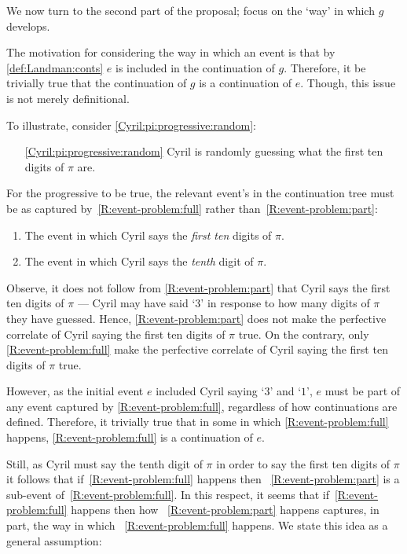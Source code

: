 \begin{note}[Way]
  We now turn to the second part of the proposal; focus on the `way' in which \(g\) develops.

  The motivation for considering the way in which an event is that by \autoref{def:Landman:conts} \(e\) is included in the continuation of \(g\).
  Therefore, it be trivially true that the continuation of \(g\) is a continuation of \(e\).
  Though, this issue is not merely definitional.

  To illustrate, consider \ref{Cyril:pi:progressive:random}:
  \begin{enumerate}[label=\arabic*., ref=(\arabic*)]
  \item[\ref{Cyril:pi:progressive:random}]
    Cyril is randomly guessing what the first ten digits of \(\pi\) are.
  \end{enumerate}
  For the progressive to be true, the relevant event's in the continuation tree must be as captured by~\ref{R:event-problem:full} rather than~\ref{R:event-problem:part}:

  \begin{enumerate}[label=\alph*., ref=(\alph*)]
  \item
    \label{R:event-problem:full}
    The event in which Cyril says the \emph{first ten} digits of \(\pi\).
  \item
    \label{R:event-problem:part}
    The event in which Cyril says the \emph{tenth} digit of \(\pi\).
  \end{enumerate}

  Observe, it does not follow from \ref{R:event-problem:part} that Cyril says the first ten digits of \(\pi\) --- Cyril may have said `\(3\)' in response to how many digits of \(\pi\) they have guessed.
  Hence, \ref{R:event-problem:part} does not make the perfective correlate of Cyril saying the first ten digits of \(\pi\) true.
  On the contrary, only \ref{R:event-problem:full} make the perfective correlate of Cyril saying the first ten digits of \(\pi\) true.

  However, as the initial event \(e\) included Cyril saying `\(3\)' and `\(1\)', \(e\) must be part of any event captured by \ref{R:event-problem:full}, regardless of how continuations are defined.
  Therefore, it trivially true that in some  in which \ref{R:event-problem:full} happens, \ref{R:event-problem:full} is a continuation of \(e\).

  Still, as Cyril must say the tenth digit of \(\pi\) in order to say the first ten digits of \(\pi\) it follows that if~\ref{R:event-problem:full} happens then ~\ref{R:event-problem:part} is a sub-event of~\ref{R:event-problem:full}.
  In this respect, it seems that if~\ref{R:event-problem:full} happens then how ~\ref{R:event-problem:part} happens captures, in part, the way in which ~\ref{R:event-problem:full} happens.
  We state this idea as a general assumption:


\end{note}
